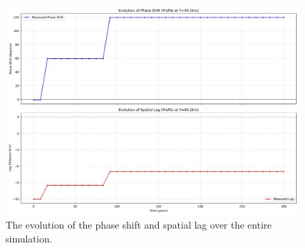 \begin{figure}[H]
    \includegraphics[scale=0.30]{S1_F_phase_evolution_summary.png}
    \caption{The evolution of the phase shift and spatial lag over the entire simulation.}
    \label{fig:phase_analysis_Evolution_Plots}
\end{figure}




